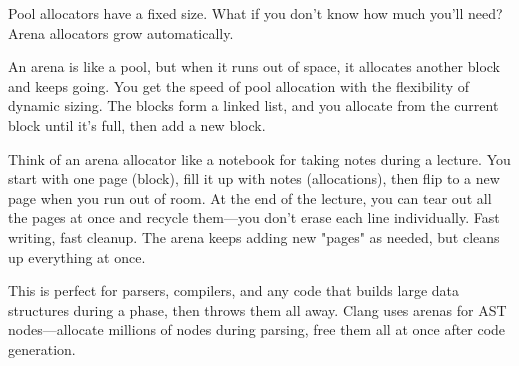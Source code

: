 Pool allocators have a fixed size. What if you don't know how much you'll need? Arena allocators grow automatically.

An arena is like a pool, but when it runs out of space, it allocates another block and keeps going. You get the speed of pool allocation with the flexibility of dynamic sizing. The blocks form a linked list, and you allocate from the current block until it's full, then add a new block.

Think of an arena allocator like a notebook for taking notes during a lecture. You start with one page (block), fill it up with notes (allocations), then flip to a new page when you run out of room. At the end of the lecture, you can tear out all the pages at once and recycle them---you don't erase each line individually. Fast writing, fast cleanup. The arena keeps adding new "pages" as needed, but cleans up everything at once.

This is perfect for parsers, compilers, and any code that builds large data structures during a phase, then throws them all away. Clang uses arenas for AST nodes---allocate millions of nodes during parsing, free them all at once after code generation.


